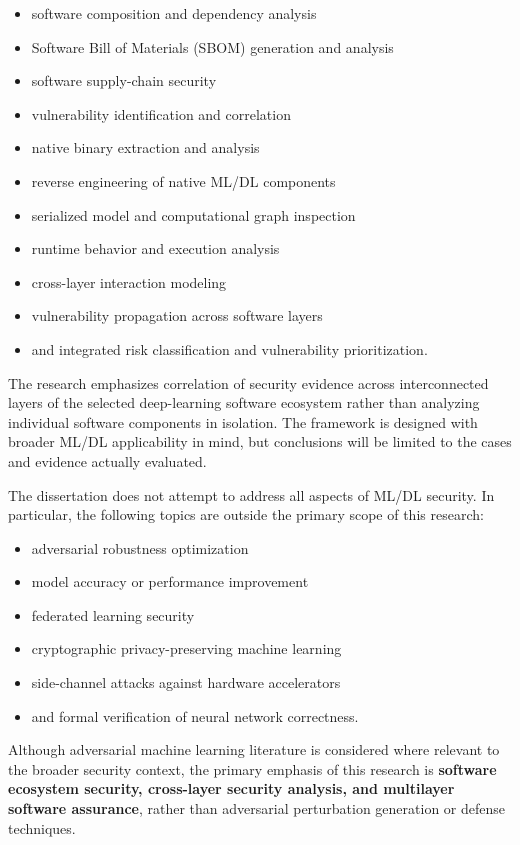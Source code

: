 \documentclass[
  12pt,
  letterpaper,
  oneside]{report}
\providecommand{\tightlist}{%
  \setlength{\itemsep}{0pt}\setlength{\parskip}{0pt}}
\begin{document}
\begin{itemize}
\tightlist
\item
  software composition and dependency analysis
\item
  Software Bill of Materials (SBOM) generation and analysis
\item
  software supply-chain security
\item
  vulnerability identification and correlation
\item
  native binary extraction and analysis
\item
  reverse engineering of native ML/DL components
\item
  serialized model and computational graph inspection
\item
  runtime behavior and execution analysis
\item
  cross-layer interaction modeling
\item
  vulnerability propagation across software layers
\item
  and integrated risk classification and vulnerability prioritization.
\end{itemize}

The research emphasizes correlation of security evidence across
interconnected layers of the selected deep-learning software ecosystem
rather than analyzing individual software components in isolation. The
framework is designed with broader ML/DL applicability in mind, but
conclusions will be limited to the cases and evidence actually
evaluated.

The dissertation does not attempt to address all aspects of ML/DL
security. In particular, the following topics are outside the primary
scope of this research:

\begin{itemize}
\tightlist
\item
  adversarial robustness optimization
\item
  model accuracy or performance improvement
\item
  federated learning security
\item
  cryptographic privacy-preserving machine learning
\item
  side-channel attacks against hardware accelerators
\item
  and formal verification of neural network correctness.
\end{itemize}

Although adversarial machine learning literature is considered where
relevant to the broader security context, the primary emphasis of this
research is \textbf{software ecosystem security, cross-layer security
analysis, and multilayer software assurance}, rather than adversarial
perturbation generation or defense techniques.
\end{document}
